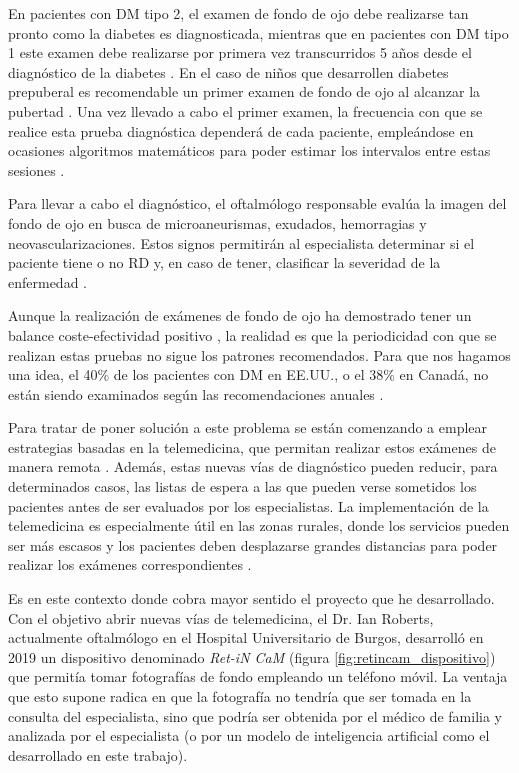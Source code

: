 En pacientes con DM tipo 2, el examen de fondo de ojo debe realizarse tan pronto como la diabetes es diagnosticada, mientras que en pacientes con DM tipo 1 este examen debe realizarse por primera vez transcurridos 5 años desde el diagnóstico de la diabetes \cite{diabetes:JDI}. En el caso de niños que desarrollen diabetes prepuberal es recomendable un primer examen de fondo de ojo al alcanzar la pubertad \cite{retinopatia:cheung}. Una vez llevado a cabo el primer examen, la frecuencia con que se realice esta prueba diagnóstica dependerá de cada paciente, empleándose en ocasiones algoritmos matemáticos para poder estimar los intervalos entre estas sesiones \cite{retinopatia:Retinal_and_eye}.

Para llevar a cabo el diagnóstico, el oftalmólogo responsable evalúa la imagen del fondo de ojo en busca de microaneurismas, exudados, hemorragias y neovascularizaciones. Estos signos permitirán al especialista determinar si el paciente tiene o no RD y, en caso de tener, clasificar la severidad de la enfermedad \cite{retino:OMS}. 

Aunque la realización de exámenes de fondo de ojo ha demostrado tener un balance coste-efectividad positivo \cite{retinopatia:Retinal_and_eye}, la realidad es que la periodicidad con que se realizan estas pruebas no sigue los patrones recomendados. Para que nos hagamos una idea, el 40\% de los pacientes con DM en EE.UU., o el 38\% en Canadá, no están siendo  examinados según las recomendaciones anuales \cite{retin:eeuu, retin:canada}.

Para tratar de poner solución a este problema se están comenzando a emplear estrategias basadas en la telemedicina, que permitan realizar estos exámenes de manera remota \cite{retino:telemedicina}. Además, estas nuevas vías de diagnóstico pueden reducir, para determinados casos, las listas de espera a las que pueden verse sometidos los pacientes antes de ser evaluados por los especialistas. La implementación de la telemedicina es especialmente útil en las zonas rurales, donde los servicios pueden ser más escasos y los pacientes deben desplazarse grandes distancias para poder realizar los exámenes correspondientes \cite{retino:rural}.

Es en este contexto donde cobra mayor sentido el proyecto que he desarrollado. Con el objetivo abrir nuevas vías de telemedicina, el Dr. Ian Roberts, actualmente oftalmólogo en el Hospital Universitario de Burgos, desarrolló en 2019 un dispositivo denominado \textit{Ret-iN CaM} (figura \ref{fig:retincam_dispositivo}) que permitía tomar fotografías de fondo empleando un teléfono móvil. La ventaja que esto supone radica en que la fotografía no tendría que ser tomada en la consulta del especialista, sino que podría ser obtenida por el médico de familia y analizada por el especialista (o por un modelo de inteligencia artificial como el desarrollado en este trabajo).

